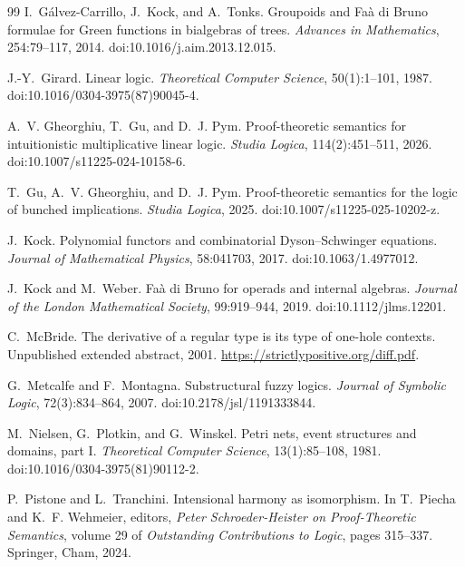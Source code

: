 \documentclass[10pt,a4paper]{article}
\theoremstyle{plain}
\theoremstyle{definition}
\theoremstyle{remark}
\begin{document}
\begin{thebibliography}{99}
I.~G\'alvez-Carrillo, J.~Kock, and A.~Tonks.
\newblock Groupoids and Fa\`a di Bruno formulae for Green functions in
bialgebras of trees.
\newblock \emph{Advances in Mathematics}, 254:79--117, 2014.
\newblock doi:10.1016/j.aim.2013.12.015.

J.-Y.~Girard.
\newblock Linear logic.
\newblock \emph{Theoretical Computer Science}, 50(1):1--101, 1987.
\newblock doi:10.1016/0304-3975(87)90045-4.

A.~V. Gheorghiu, T.~Gu, and D.~J. Pym.
\newblock Proof-theoretic semantics for intuitionistic multiplicative
linear logic.
\newblock \emph{Studia Logica}, 114(2):451--511, 2026.
\newblock doi:10.1007/s11225-024-10158-6.

T.~Gu, A.~V. Gheorghiu, and D.~J. Pym.
\newblock Proof-theoretic semantics for the logic of bunched implications.
\newblock \emph{Studia Logica}, 2025.
\newblock doi:10.1007/s11225-025-10202-z.

J.~Kock.
\newblock Polynomial functors and combinatorial Dyson--Schwinger equations.
\newblock \emph{Journal of Mathematical Physics}, 58:041703, 2017.
\newblock doi:10.1063/1.4977012.

J.~Kock and M.~Weber.
\newblock Fa\`a di Bruno for operads and internal algebras.
\newblock \emph{Journal of the London Mathematical Society},
99:919--944, 2019.
\newblock doi:10.1112/jlms.12201.

C.~McBride.
\newblock The derivative of a regular type is its type of one-hole contexts.
\newblock Unpublished extended abstract, 2001.
\newblock \url{https://strictlypositive.org/diff.pdf}.

G.~Metcalfe and F.~Montagna.
\newblock Substructural fuzzy logics.
\newblock \emph{Journal of Symbolic Logic}, 72(3):834--864, 2007.
\newblock doi:10.2178/jsl/1191333844.

M.~Nielsen, G.~Plotkin, and G.~Winskel.
\newblock Petri nets, event structures and domains, part I.
\newblock \emph{Theoretical Computer Science}, 13(1):85--108, 1981.
\newblock doi:10.1016/0304-3975(81)90112-2.

P.~Pistone and L.~Tranchini.
\newblock Intensional harmony as isomorphism.
\newblock In T.~Piecha and K.~F. Wehmeier, editors,
\emph{Peter Schroeder-Heister on Proof-Theoretic Semantics},
volume 29 of \emph{Outstanding Contributions to Logic},
pages 315--337. Springer, Cham, 2024.


\end{thebibliography}
\end{document}
